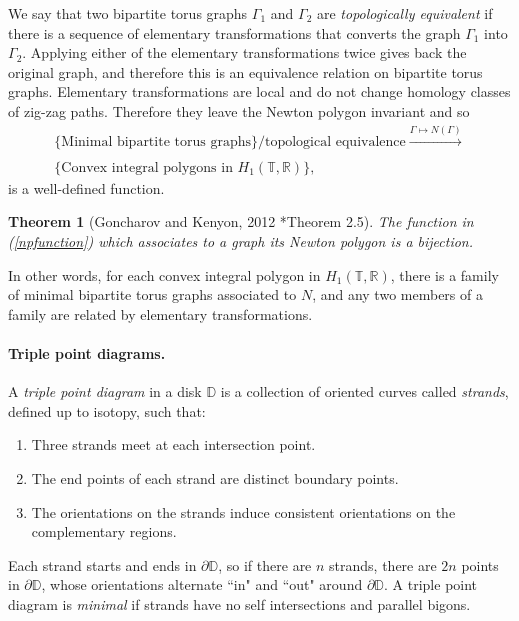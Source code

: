 \documentclass[11pt]{article} %
\newtheorem{theorem}{Theorem}[section]
\theoremstyle{definition}
\newcommand{\R}{{\mathbb R}}
\newcommand{\T}{{\mathbb T}}
\begin{document}
We say that two bipartite torus graphs $\Gamma_1$ and $\Gamma_2$ are \textit{topologically equivalent} if there is a sequence of elementary transformations that converts the graph $\Gamma_1$ into $\Gamma_2$. Applying either of the elementary transformations twice gives back the original graph, and therefore this is an equivalence relation on bipartite torus graphs. Elementary transformations are local and do not change homology classes of zig-zag paths. Therefore they leave the Newton polygon invariant and so
\begin{align}\label{npfunction}
\{\text{Minimal bipartite torus graphs}\}/\text{topological equivalence} \xrightarrow[]{\Gamma \mapsto N(\Gamma) } \nonumber \\ \{\text{Convex integral polygons in }H_1(\T,\R)\},
\end{align}
is a well-defined function.

\begin{theorem}[Goncharov and Kenyon, 2012 \cite{GK12}*{Theorem 2.5}]\label{family}
The function in (\ref{npfunction}) which associates to a graph its Newton polygon is a bijection.
\end{theorem}
In other words, for each convex integral polygon in $H_1(\T,\R)$, there is a family of minimal bipartite torus graphs associated to $N$, and any two members of a family are related by elementary transformations.

\paragraph{Triple point diagrams.}


A \textit{triple point diagram} in a disk $\mathbb D$ is a collection of oriented curves called \textit{strands}, defined up to isotopy, such that:

\begin{enumerate}
\item Three strands meet at each intersection point.
\item The end points of each strand are distinct boundary points.
\item The orientations on the strands induce consistent orientations on the complementary regions.
\end{enumerate}
Each strand starts and ends in $\partial \mathbb D$, so if there are $n$ strands, there are $2n$ points in $\partial \mathbb D$, whose orientations alternate ``in" and ``out" around $\partial \mathbb D$. A triple point diagram is \textit{minimal} if strands have no self intersections and parallel bigons.\\
\end{document}
